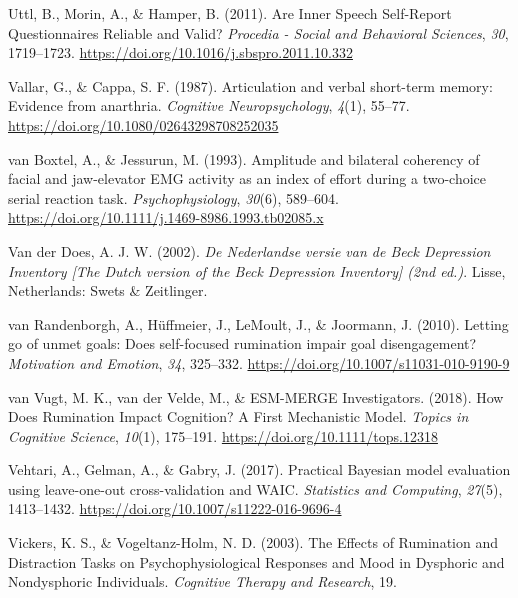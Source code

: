\documentclass[a4paper,12pt,twoside,onecolumn,openright,final,oldfontcommands]{memoir}
\begin{document}
\leavevmode\hypertarget{ref-Uttl2011}{}%
Uttl, B., Morin, A., \& Hamper, B. (2011). Are Inner Speech Self-Report Questionnaires Reliable and Valid? \emph{Procedia - Social and Behavioral Sciences}, \emph{30}, 1719--1723. \url{https://doi.org/10.1016/j.sbspro.2011.10.332}

\leavevmode\hypertarget{ref-vallar_articulation_1987}{}%
Vallar, G., \& Cappa, S. F. (1987). Articulation and verbal short-term memory: Evidence from anarthria. \emph{Cognitive Neuropsychology}, \emph{4}(1), 55--77. \url{https://doi.org/10.1080/02643298708252035}

\leavevmode\hypertarget{ref-van_boxtel_amplitude_1993}{}%
van Boxtel, A., \& Jessurun, M. (1993). Amplitude and bilateral coherency of facial and jaw-elevator EMG activity as an index of effort during a two-choice serial reaction task. \emph{Psychophysiology}, \emph{30}(6), 589--604. \url{https://doi.org/10.1111/j.1469-8986.1993.tb02085.x}

\leavevmode\hypertarget{ref-van_der_does_nederlandse_2002}{}%
Van der Does, A. J. W. (2002). \emph{De Nederlandse versie van de Beck Depression Inventory {[}The Dutch version of the Beck Depression Inventory{]} (2nd ed.)}. Lisse, Netherlands: Swets \& Zeitlinger.

\leavevmode\hypertarget{ref-VanRandenborgh2010}{}%
van Randenborgh, A., Hüffmeier, J., LeMoult, J., \& Joormann, J. (2010). Letting go of unmet goals: Does self-focused rumination impair goal disengagement? \emph{Motivation and Emotion}, \emph{34}, 325--332. \url{https://doi.org/10.1007/s11031-010-9190-9}

\leavevmode\hypertarget{ref-van_vugt_how_2018}{}%
van Vugt, M. K., van der Velde, M., \& ESM-MERGE Investigators. (2018). How Does Rumination Impact Cognition? A First Mechanistic Model. \emph{Topics in Cognitive Science}, \emph{10}(1), 175--191. \url{https://doi.org/10.1111/tops.12318}

\leavevmode\hypertarget{ref-vehtari_practical_2017}{}%
Vehtari, A., Gelman, A., \& Gabry, J. (2017). Practical Bayesian model evaluation using leave-one-out cross-validation and WAIC. \emph{Statistics and Computing}, \emph{27}(5), 1413--1432. \url{https://doi.org/10.1007/s11222-016-9696-4}

\leavevmode\hypertarget{ref-vickers_effects_2003}{}%
Vickers, K. S., \& Vogeltanz-Holm, N. D. (2003). The Effects of Rumination and Distraction Tasks on Psychophysiological Responses and Mood in Dysphoric and Nondysphoric Individuals. \emph{Cognitive Therapy and Research}, 19.
\end{document}
